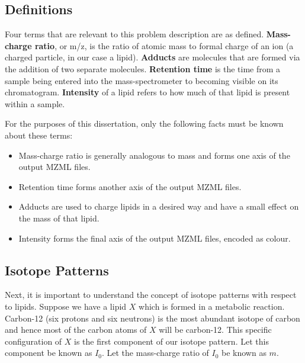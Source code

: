 \documentclass{l4proj}
\begin{document}
\subsection{Definitions}
Four terms that are relevant to this problem description are as defined. \textbf{Mass-charge ratio}, or m/z, is the ratio of atomic mass to formal charge of an ion (a charged particle, in our case a lipid). \textbf{Adducts} are molecules that are formed via the addition of two separate molecules. \textbf{Retention time} is the time from a sample being entered into the mass-spectrometer to becoming visible on its chromatogram. \textbf{Intensity} of a lipid refers to how much of that lipid is present within a sample.

For the purposes of this dissertation, only the following facts must be known about these terms:
\begin{itemize}
\item Mass-charge ratio is generally analogous to mass and forms one axis of the output MZML files.
\item Retention time forms another axis of the output MZML files.
\item Adducts are used to charge lipids in a desired way and have a small effect on the mass of that lipid.
\item Intensity forms the final axis of the output MZML files, encoded as colour.
\end{itemize}

\subsection{Isotope Patterns}

Next, it is important to understand the concept of isotope patterns with respect to lipids. Suppose we have a lipid $X$ which is formed in a metabolic reaction. Carbon-12 (six protons and six neutrons) is the most abundant isotope of carbon and hence most of the carbon atoms of $X$ will be carbon-12. This specific configuration of $X$ is the first component of our isotope pattern. Let this component be known as $I_0$. Let the mass-charge ratio of $I_0$ be known as $m$.
\end{document}
